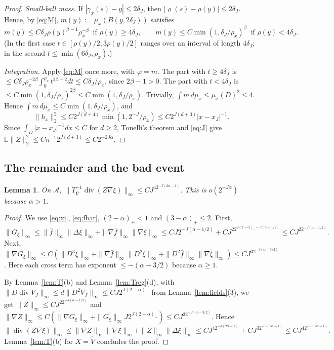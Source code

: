 \documentclass[11pt]{article}
\newtheorem{lemma}[theorem]{Lemma}
\theoremstyle{definition}
\theoremstyle{remark}
\newcommand{\E}{\mathbb E}
\newcommand{\dv}{\operatorname{div}}
\newcommand{\cA}{\mathcal A}
\begin{document}
\begin{proof}
\emph{Small-ball mass.} If $|\gamma_x(s)-y|\le2\delta_J$, then $|\varrho(s)-\rho(y)|\le2\delta_J$. Hence, by \eqref{eq:M}, $m(y):=\mu_x(B(y,2\delta_J))$ satisfies
\[
m(y)\le C\delta_J\rho(y)^{\beta-1}\rho_x^{-\beta}\ \text{ if }\rho(y)\ge4\delta_J,\qquad m(y)\le C\min(1,\delta_J/\rho_x)^\beta\ \text{ if }\rho(y)<4\delta_J .
\]
(In the first case $t\in[\rho(y)/2,3\rho(y)/2]$ ranges over an interval of length $4\delta_J$; in the second $t\le\min(6\delta_J,\rho_x)$.)

\emph{Integration.} Apply \eqref{eq:M} once more, with $\varphi=m$. The part with $t\ge4\delta_J$ is
$\le C\delta_J\rho_x^{-2\beta}\int_0^{\rho_x}t^{2\beta-2}dt\le C\delta_J/\rho_x$, since $2\beta-1>0$.
The part with $t<4\delta_J$ is $\le C\min(1,\delta_J/\rho_x)^{2\beta}\le C\min(1,\delta_J/\rho_x)$. Trivially, $\int m\,d\mu_x\le\mu_x(D)^2\le4$. Hence $\int m\,d\mu_x\le C\min(1,\delta_J/\rho_x)$, and
\[
\|h_x\|_2^2\le C2^{J(d+4)}\min(1,2^{-J}/\rho_x)\le C2^{J(d+3)}|x-x_J|^{-1}.
\]
Since $\int_D|x-x_J|^{-1}dx\le C$ for $d\ge2$, Tonelli's theorem and \eqref{eq:J} give $\E\|Z\|_2^2\le Cn^{-1}2^{J(d+3)}\le C2^{-2J\alpha}$.
\end{proof}

\subsection{The remainder and the bad event}

\begin{lemma}\label{lem:rem}
On $\cA$, $\|T^{-1}_{\hat V}\dv(Z\nabla\xi)\|_\infty\le CJ^42^{-J(2\alpha-1)}$. This is $o(2^{-J\alpha})$ because $\alpha>1$.
\end{lemma}

\begin{proof}
We use \eqref{eq:xi}, \eqref{eq:fbar}, $(2-\alpha)_+<1$ and $(3-\alpha)_+\le2$. First,
\[
\|G_\xi\|_\infty\le\|\bar f\|_\infty\|\Delta\xi\|_\infty+\|\nabla\bar f\|_\infty\|\nabla\xi\|_\infty\le CJ2^{-J(\alpha-1/2)}+CJ^22^{J(2-\alpha)_+-J(\alpha+1/2)}\le CJ^22^{-J(\alpha-1/2)} .
\]
Next, $\|\nabla G_\xi\|_\infty\le C(\|D^3\xi\|_\infty+\|\nabla\bar f\|_\infty\|D^2\xi\|_\infty+\|D^2\bar f\|_\infty\|\nabla\xi\|_\infty)\le CJ^32^{-J(\alpha-3/2)}$. Here each cross term has exponent $\le-(\alpha-3/2)$ because $\alpha\ge1$.

By Lemma~\ref{lem:T}(b) and Lemma~\ref{lem:Treg}(d), with $\|D\dv V_J\|_\infty\le d\|D^2V_J\|_\infty\le CJ2^{J(2-\alpha)_+}$ from Lemma~\ref{lem:fields}(3), we get
$\|Z\|_\infty\le CJ^22^{-J(\alpha-1/2)}$ and
$\|\nabla Z\|_\infty\le C(\|\nabla G_\xi\|_\infty+\|G_\xi\|_\infty J2^{J(2-\alpha)_+})\le CJ^32^{-J(\alpha-3/2)}$.
Hence
\[
\|\dv(Z\nabla\xi)\|_\infty\le\|\nabla Z\|_\infty\|\nabla\xi\|_\infty+\|Z\|_\infty\|\Delta\xi\|_\infty\le CJ^42^{-J(2\alpha-1)}+CJ^32^{-J(2\alpha-1)}\le CJ^42^{-J(2\alpha-1)} .
\]
Lemma~\ref{lem:T}(b) for $X=\hat V$ concludes the proof.
\end{proof}
\end{document}
